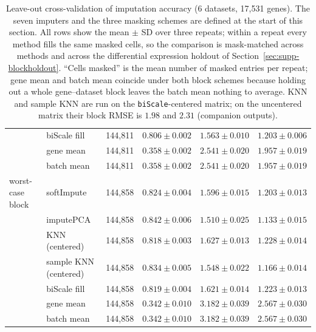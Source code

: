 \documentclass[11pt,a4paper]{article}
\begin{document}
\begin{table}[htbp]
\begin{tabular}{@{}llrccc@{}}
 & biScale fill & 144{,}811 & $0.806 \pm 0.002$ & $1.563 \pm 0.010$ & $1.203 \pm 0.006$ \\
 & gene mean & 144{,}811 & $0.358 \pm 0.002$ & $2.541 \pm 0.020$ & $1.957 \pm 0.019$ \\
 & batch mean & 144{,}811 & $0.358 \pm 0.002$ & $2.541 \pm 0.020$ & $1.957 \pm 0.019$ \\
\addlinespace
worst-case block & softImpute & 144{,}858 & $0.824 \pm 0.004$ & $1.596 \pm 0.015$ & $1.203 \pm 0.013$ \\
 & imputePCA & 144{,}858 & $0.842 \pm 0.006$ & $1.510 \pm 0.025$ & $1.133 \pm 0.015$ \\
 & KNN (centered) & 144{,}858 & $0.818 \pm 0.003$ & $1.627 \pm 0.013$ & $1.228 \pm 0.014$ \\
 & sample KNN (centered) & 144{,}858 & $0.834 \pm 0.005$ & $1.548 \pm 0.022$ & $1.166 \pm 0.014$ \\
 & biScale fill & 144{,}858 & $0.819 \pm 0.004$ & $1.621 \pm 0.014$ & $1.223 \pm 0.013$ \\
 & gene mean & 144{,}858 & $0.342 \pm 0.010$ & $3.182 \pm 0.039$ & $2.567 \pm 0.030$ \\
 & batch mean & 144{,}858 & $0.342 \pm 0.010$ & $3.182 \pm 0.039$ & $2.567 \pm 0.030$ \\
\bottomrule
\end{tabular}
\caption{Leave-out cross-validation of imputation accuracy
  (6 datasets, 17{,}531 genes). The seven
  imputers and the three masking schemes are defined at the
  start of this section. All rows show the mean $\pm$ SD over three
  repeats; within a repeat every method fills the same masked
  cells, so the comparison is mask-matched across methods and
  across the differential expression holdout of
  Section~\ref{sec:supp-blockholdout}. ``Cells masked'' is the
  mean number of masked entries per repeat; gene mean and
  batch mean coincide under both block schemes because holding
  out a whole gene--dataset block leaves the batch mean nothing
  to average. KNN and sample KNN are run on the
  \texttt{biScale}-centered matrix; on the uncentered matrix their
  block RMSE is $1.98$ and $2.31$ (companion outputs).}
\label{tab:supp-imputation}
\end{table}
\end{document}
